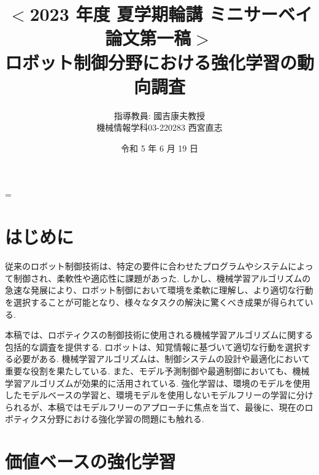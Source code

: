 \documentclass[a4j, twocolumn, 10pt,pdflatex,ja=standard]{bxjsarticle}
\title{{\small $<$2023 年度 夏学期輪講 ミニサーベイ論文第一稿$>$}\\
       {\Large ロボット制御分野における強化学習の動向調査}\vspace{-4mm}}
\author{{\normalsize 指導教員: 國吉康夫教授\\機械情報学科03-220283 西宮直志}\vspace{-4mm}}
\date{\small 令和 5 年 6 月 19 日}
\makeatletter
\renewcommand\maketitle{
  \ifnum \col@number=\@ne \@maketitle
  \else \twocolumn[
    \vspace{-16mm}
    \@maketitle
  ]
  \fi
 }
\makeatother
\begin{document}
\maketitle \thispagestyle{empty}
\normalsize
\vspace{-8mm}

\section{はじめに}

従来のロボット制御技術は、特定の要件に合わせたプログラムやシステムによって制御され、柔軟性や適応性に課題があった. しかし、機械学習アルゴリズムの急速な発展により、ロボット制御において環境を柔軟に理解し、より適切な行動を選択することが可能となり、様々なタスクの解決に驚くべき成果が得られている. 

本稿では、ロボティクスの制御技術に使用される機械学習アルゴリズムに関する包括的な調査を提供する. ロボットは、知覚情報に基づいて適切な行動を選択する必要がある. 機械学習アルゴリズムは、制御システムの設計や最適化において重要な役割を果たしている. また、モデル予測制御や最適制御においても、機械学習アルゴリズムが効果的に活用されている. 強化学習は、環境のモデルを使用したモデルベースの学習と、環境モデルを使用しないモデルフリーの学習に分けられるが、本稿ではモデルフリーのアプローチに焦点を当て、最後に、現在のロボティクス分野における強化学習の問題にも触れる. 





\section{価値ベースの強化学習}
\end{document}
